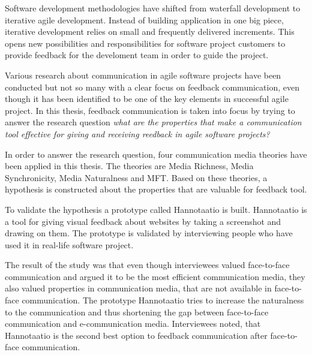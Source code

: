 \documentclass[english,12pt,a4paper,pdftex]{article}
\begin{document}
\newpage
%
\begin{abstractpage}[english]

Software development methodologies have shifted from waterfall development to iterative agile development. Instead of building application in one big piece, iterative development relies on small and frequently delivered increments. This opens new possibilities and responsibilities for software project customers to provide feedback for the develoment team in order to guide the project.

Various research about communication in agile software projects have been conducted but not so many with a clear focus on feedback communication, even though it has been identified to be one of the key elements in successful agile project. In this thesis, feedback communication is taken into focus by trying to answer the research question \emph{what are the properties that make a communication tool effective for giving and receiving reedback in agile software projects?}

In order to answer the research question, four communication media theories have been applied in this thesis. The theories are Media Richness, Media Synchronicity, Media Naturalness and \ac{MFT}. Based on these theories, a hypothesis is constructed about the properties that are valuable for feedback tool.

To validate the hypothesis a prototype called Hannotaatio is built. Hannotaatio is a tool for giving visual feedback about websites by taking a screenshot and drawing on them. The prototype is validated by interviewing people who have used it in real-life software project.

The result of the study was that even though interviewees valued face-to-face communication and argued it to be the most efficient communication media, they also valued properties in communication media, that are not available in face-to-face communication. The prototype Hannotaatio tries to increase the naturalness to the communication and thus shortening the gap between face-to-face communication and e-communication media. Interviewees noted, that Hannotaatio is the second best option to feedback communication after face-to-face communication.

\end{abstractpage}
\end{document}
